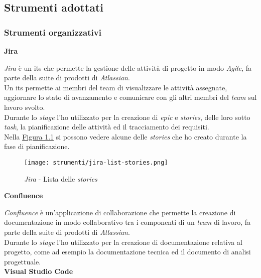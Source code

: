 \pagebreak
\subsection{Strumenti adottati}
\label{sez:strumenti-adottati}

\subsubsection{Strumenti organizzativi}
\label{sez:strumenti-organizzativi}

\noindent \textbf{Jira\\}

\noindent \textit{Jira} è un \gls{its} che permette la gestione delle attività di progetto in modo \textit{Agile}, fa parte della suite di prodotti di \textit{Atlassian}.\\
Un \gls{its} permette ai membri del team di visualizzare le attività assegnate, aggiornare lo stato di avanzamento e comunicare con gli altri membri del \textit{team} sul lavoro svolto. \\
Durante lo \textit{stage} l'ho utilizzato per la creazione di \textit{epic} e \textit{stories}, delle loro sotto \textit{task}, la pianificazione delle attività ed il tracciamento dei requisiti. \\
Nella {\hyperref[fig:jira-list-stories]{Figura 1.1}} si possono vedere alcune delle \textit{stories} che ho creato durante la fase di pianificazione.
\begin{figure}[H]
    \label{fig:jira-list-stories}
    \centering
    \texttt{[image: strumenti/jira-list-stories.png]}
    \caption{\textit{Jira} - Lista delle \textit{stories}}
\end{figure}

\noindent \textbf{Confluence\\}

\noindent \textit{Confluence} è un'applicazione di collaborazione che permette la creazione di documentazione in modo collaborativo tra i componenti di un \textit{team} di lavoro, fa parte della suite di prodotti di \textit{Atlassian}.\\
Durante lo \textit{stage} l'ho utilizzato per la creazione di documentazione relativa al progetto, come ad esempio la documentazione tecnica ed il documento di analisi progettuale.\\

\pagebreak
\noindent \textbf{Visual Studio Code\\}

